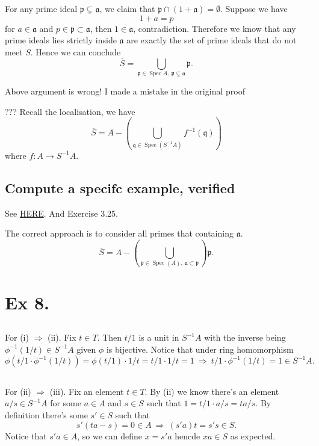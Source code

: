 For any prime ideal $\mathfrak p\subsetneq \mathfrak a$, we claim that $\mathfrak p\cap (1+\mathfrak a)=\emptyset$. Suppose we have 
$$1+a=p$$ for $a\in\mathfrak a$ and $p\in\mathfrak p\subset\mathfrak a$, then $1\in \mathfrak a$, contradiction. 
Therefore we know that any prime ideals lies strictly inside $\mathfrak a$ are exactly the set of prime ideals that do not meet $S$. Hence we can conclude 
$$\overline{S}=\bigcup_{\mathfrak p\in\operatorname{Spec}A,~\mathfrak p\subsetneq \mathfrak a}\mathfrak p.$$

Above argument is wrong! I made a mistake in the original proof 

??? Recall the localisation, we have 
$$\overline{S}=A-\left(\bigcup_{\mathfrak q\in\operatorname{Spec}(S^{-1}A)}f^{-1}(\mathfrak q)\right)$$ where $f:A\to S^{-1}A$.

\subsection{Compute a specifc example, verified}

See \href{https://math.stackexchange.com/questions/1635191/saturation-of-a-multiplicatively-closed-subset}{HERE}. And \cite{altman} Exercise 3.25. 

The correct approach is to consider all primes that containing $\mathfrak a$.
$$\overline{S}=A-\left(\bigcup_{\mathfrak p\in\operatorname{Spec}(A),~ \mathfrak a\subset\mathfrak p}\right)\mathfrak p.$$

\section{Ex 8.}

\subsection{}

For (i) $\Rightarrow$ (ii). Fix $t\in T$. Then $t/1$ is a unit in $S^{-1}A$ with the inverse being $\phi^{-1}(1/t)\in S^{-1}A$ given $\phi$ is bijective. 
Notice that under ring homomorphism 
\[\phi(t/1\cdot\phi^{-1}(1/t))=\phi(t/1)\cdot 1/t=t/1\cdot 1/t=1 ~\Rightarrow~ t/1\cdot\phi^{-1}(1/t)=1\in S^{-1}A.\]

\subsection{}

For (ii) $\Rightarrow$ (iii). Fix an element $t\in T$. By (ii) we know there's an element $a/s\in S^{-1}A$ for some $a\in A$ and $s\in S$ such that $1=t/1\cdot a/s=ta/s$. By definition there's some $s'\in S$ such that \[s'(ta-s)=0\in A ~\Rightarrow~ (s'a)t=s's\in S.\] Notice that $s'a\in A$, so we can define $x=s'a$ hencde $xa\in S$ as expected. 

